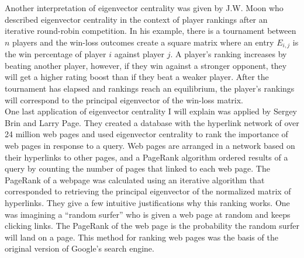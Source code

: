 \documentclass{article}
\theoremstyle{definition}
\theoremstyle{remark}
\begin{document}
Another interpretation of eigenvector centrality was given by J.W. Moon who described eigenvector centrality in the context of player rankings after an iterative round-robin competition.  In his example, there is a tournament between $n$ players and the win-loss outcomes create a square matrix where an entry $E_{i,j}$ is the win percentage of player $i$ against player $j$.  A player's ranking increases by beating another player, however, if they win against a stronger opponent, they will get a higher rating boost than if they beat a weaker player.  After the tournament has elapsed and rankings reach an equilibrium, the player's rankings will correspond to the principal eigenvector of the win-loss matrix.\cite{moon1970generalized}\\

One last application of eigenvector centrality I will explain was applied by Sergey Brin and Larry Page.  They created a database with the hyperlink network of over 24 million web pages and used eigenvector centrality to rank the importance of web pages in response to a query.  Web pages are arranged in a network based on their hyperlinks to other pages, and a PageRank algorithm ordered results of a query by counting the number of pages that linked to each web page.  The PageRank of a webpage was calculated using an iterative algorithm that corresponded to retrieving the principal eigenvector of the normalized matrix of hyperlinks.  They give a few intuitive justifications why this ranking works.  One was imagining a “random surfer” who is given a web page at random and keeps clicking links.  The PageRank of the web page is the probability the random surfer will land on a page.  This method for ranking web pages was the basis of the original version of Google’s search engine.\cite{page1999pagerank} \\
\end{document}
